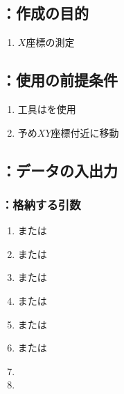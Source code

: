 \subsection{\MXIface：作成の目的}
\begin{enumerate}[label*=\sarrow]
\item \OutcutCenter $X$座標の測定
\end{enumerate}


\subsection{\MXIface：使用の前提条件}
\begin{enumerate}[label*=\sarrow]
\item 工具は\TouchSensorProbe を使用
\item 予め\OutcutCenter$XY$座標付近に移動
\end{enumerate}


\subsection{\MXIface：データの入出力}

\subsubsection{\MXIface：格納する引数}
\begin{enumerate}[label*=\sarrow]
\item \PMTopOutcutACWidth または\PMBottomOutcutACWidth
\item \PMTopEndACID または\PMBottomEndACID
\item \PMTopEndFaceInChamferLength または\PMBottomEndFaceInChamferLength
\item \PMTopOutcutAsideThickness または\PMBottomOutcutAsideThickness
\item \PMTopAlocationLength または\PMBottomAlocationLength
\item \PMTopReAlocationLength または\PMBottomReAlocationLength
\item \PMCenterCurvatureRadius
\item \PMPlatingThk
\end{enumerate}

